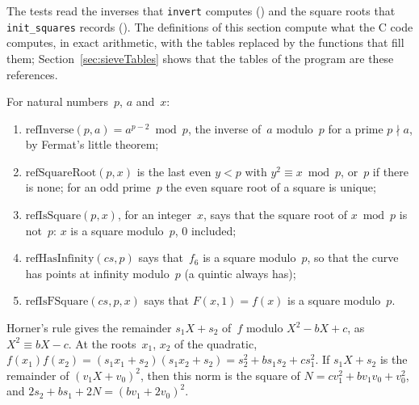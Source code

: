 The tests read the inverses that \texttt{invert} computes () and the
square roots that \texttt{init\_squares} records (). The definitions
of this section compute what the C code computes, in exact arithmetic, with the tables replaced by
the functions that fill them; Section~\ref{sec:sieveTables} shows that the tables of the program are
these references.

\begin{definition}\label{def:refIsSquare}
  \leanok
  For natural numbers~$p$, $a$ and~$x$:
  \begin{enumerate}
    \item $\mathrm{refInverse}(p, a) = a^{p - 2} \bmod p$, the inverse of~$a$ modulo~$p$ for a prime
      $p \nmid a$, by Fermat's little theorem;
    \item $\mathrm{refSquareRoot}(p, x)$ is the last even $y < p$ with $y^2 \equiv x \bmod p$,
      or~$p$ if there is none; for an odd prime~$p$ the even square root of a square is unique;
    \item $\mathrm{refIsSquare}(p, x)$, for an integer~$x$, says that the square root of $x \bmod p$
      is not~$p$: $x$ is a square modulo~$p$, $0$ included;
    \item $\mathrm{refHasInfinity}(\mathit{cs}, p)$ says that~$f_6$ is a square modulo~$p$, so that
      the curve has points at infinity modulo~$p$ (a quintic always has);
    \item $\mathrm{refIsFSquare}(\mathit{cs}, p, x)$ says that $F(x, 1) = f(x)$ is a square
      modulo~$p$.
  \end{enumerate}
\end{definition}

Horner's rule gives the remainder $s_1 X + s_2$ of~$f$ modulo $X^2 - b X + c$, as
$X^2 \equiv b X - c$. At the roots~$x_1$, $x_2$ of the quadratic,
$f(x_1) f(x_2) = (s_1 x_1 + s_2)(s_1 x_2 + s_2) = s_2^2 + b s_1 s_2 + c s_1^2$. If $s_1 X + s_2$ is
the remainder of $(v_1 X + v_0)^2$, then this norm is the square of
$N = c v_1^2 + b v_1 v_0 + v_0^2$, and $2 s_2 + b s_1 + 2 N = (b v_1 + 2 v_0)^2$.

